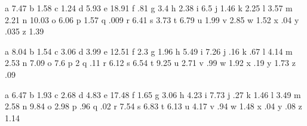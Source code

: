 


\startcharactertable[nl]
  \charfreq a  7.47
  \charfreq b  1.58
  \charfreq c  1.24
  \charfreq d  5.93
  \charfreq e 18.91
  \charfreq f   .81
  \charfreq g  3.4
  \charfreq h  2.38
  \charfreq i  6.5
  \charfreq j  1.46
  \charfreq k  2.25
  \charfreq l  3.57
  \charfreq m  2.21
  \charfreq n 10.03
  \charfreq o  6.06
  \charfreq p  1.57
  \charfreq q   .009
  \charfreq r  6.41
  \charfreq s  3.73
  \charfreq t  6.79
  \charfreq u  1.99
  \charfreq v  2.85
  \charfreq w  1.52
  \charfreq x   .04
  \charfreq y   .035
  \charfreq z  1.39
\stopcharactertable




\startcharactertable[en]
  \charfreq a  8.04
  \charfreq b  1.54
  \charfreq c  3.06
  \charfreq d  3.99
  \charfreq e 12.51
  \charfreq f  2.3
  \charfreq g  1.96
  \charfreq h  5.49
  \charfreq i  7.26
  \charfreq j   .16
  \charfreq k   .67
  \charfreq l  4.14
  \charfreq m  2.53
  \charfreq n  7.09
  \charfreq o  7.6
  \charfreq p  2
  \charfreq q   .11
  \charfreq r  6.12
  \charfreq s  6.54
  \charfreq t  9.25
  \charfreq u  2.71
  \charfreq v   .99
  \charfreq w  1.92
  \charfreq x   .19
  \charfreq y  1.73
  \charfreq z   .09
\stopcharactertable


\startcharactertable[de]
  \charfreq a  6.47
  \charfreq b  1.93
  \charfreq c  2.68
  \charfreq d  4.83
  \charfreq e 17.48
  \charfreq f  1.65
  \charfreq g  3.06
  \charfreq h  4.23
  \charfreq i  7.73
  \charfreq j   .27
  \charfreq k  1.46
  \charfreq l  3.49
  \charfreq m  2.58
  \charfreq n  9.84
  \charfreq o  2.98
  \charfreq p   .96
  \charfreq q   .02
  \charfreq r  7.54
  \charfreq s  6.83
  \charfreq t  6.13
  \charfreq u  4.17
  \charfreq v   .94
  \charfreq w  1.48
  \charfreq x   .04
  \charfreq y   .08
  \charfreq z  1.14
\stopcharactertable

\endinput